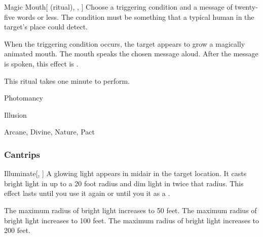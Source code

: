 \lowercase{\hypertarget{spell:Magic Mouth}{}}\label{spell:Magic Mouth}
\begin{attuneability}[Rank 1]{\hypertarget{spell:Magic Mouth}{Magic Mouth}}[ (ritual), , ]
Choose a triggering condition and a message of twenty-five words or less.
The condition must be something that a typical human in the target's place could detect.

When the triggering condition occurs, the target appears to grow a magically animated mouth.
The mouth speaks the chosen message aloud.
After the message is spoken, this effect is .

This ritual takes one minute to perform.
\end{attuneability}
\vspace{0.25em}


\newpage
\begin{spellsection}{Photomancy}

\begin{spellheader}
\end{spellheader}


 Illusion

 Arcane, Divine, Nature, Pact

\subsubsection{Cantrips}


\begin{freeability}{Illuminate}[, ]
A glowing light appears in midair in the target location.
It casts bright light in up to a 20 foot radius and dim light in twice that radius.
This effect lasts until you use it again or until you  it as a .

\rankline
{} The maximum radius of bright light increases to 50 feet.
 The maximum radius of bright light increases to 100 feet.
 The maximum radius of bright light increases to 200 feet.
\end{freeability}

\end{spellsection}



